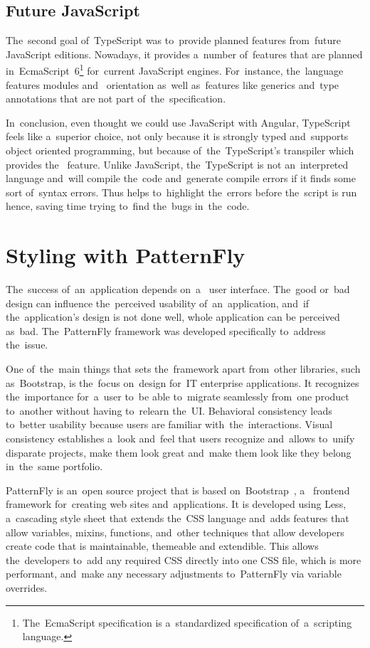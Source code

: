 \subsection{Future JavaScript}
The~second goal of~TypeScript was to~provide planned features from~future
JavaScript editions. Nowadays, it provides a~number of~features that are planned
in~EcmaScript~6\footnote{The~EcmaScript specification is a~standardized
specification of~a~scripting language.} for~current JavaScript engines.
For~instance, the~language features modules and~ orientation
as~well as~features like generics and~type annotations that are not part
of~the~specification.

In~conclusion, even thought we could use JavaScript with Angular, TypeScript
feels like a~superior choice, not only because it is strongly typed and~supports
object oriented programming, but because of~the~TypeScript's transpiler which
provides the~ feature. Unlike JavaScript,
the~TypeScript is not an~interpreted language and~will compile the~code
and~generate compile errors if it finds some sort of~syntax errors. Thus
helps to~highlight the~errors before the~script is run hence, saving time trying
to~find the~bugs in~the~code.


\section{Styling with PatternFly}
The~success of~an~application depends on~a~ user interface.
The~good or~bad design can influence the~perceived usability of~an~application,
and~if the~application's design is not done well, whole application can be
perceived as~bad. The~PatternFly framework was developed specifically to~address
the~issue.

One of~the~main things that sets the~framework apart from~other libraries, such
as~Bootstrap, is the~focus on~design for~IT enterprise applications. It
recognizes the~importance for~a~user to~be able to~migrate seamlessly from~one
product to~another without having to~relearn the~UI. Behavioral consistency
leads to~better usability because users are familiar with~the~interactions.
Visual consistency establishes a~look and~feel that users recognize and~allows
to~unify disparate projects, make them look great and~make them look like they
belong in~the~same portfolio.

PatternFly is an~open source project that is based
on~Bootstrap~\cite{Bootstrap}, a~ frontend framework
for~creating web sites and~applications. It is developed using Less, a~cascading
style sheet  that extends the~CSS language and~adds features
that allow variables, mixins, functions, and~other techniques that allow
developers create code that is maintainable, themeable and extendible. This
allows the~developers to~add any required  CSS directly into
one CSS file, which is more performant, and~make any necessary adjustments
to~PatternFly via variable overrides.

